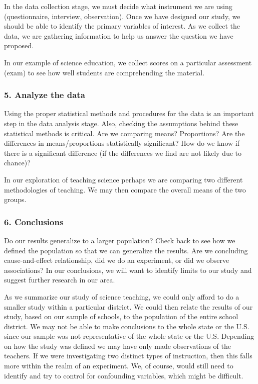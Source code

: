 \documentclass[11pt, chapterprefix=true]{scrbook}\usepackage[]{graphicx}\usepackage[]{color}
\begin{document}
In the data collection stage, we must decide what instrument we are using (questionnaire, interview, observation).  Once we have designed our study, we should be able to identify the primary variables of interest.  As we collect the data, we are gathering information to help us answer the question we have proposed.

In our example of science education, we collect scores on a particular assessment (exam) to see how well students are comprehending the material.

\subsubsection{5. Analyze the data}

Using the proper statistical methods and procedures for the data is an important step in the data analysis stage.  Also, checking the assumptions behind these statistical methods is critical.  Are we comparing means?  Proportions?  Are the differences in means/proportions statistically significant?  How do we know if there is a significant difference (if the differences we find are not likely due  to chance)?

In our exploration of teaching science perhaps we are comparing two different methodologies of teaching.  We may then compare the overall means of the two groups.

\subsubsection{6. Conclusions}

Do our results generalize to a larger population?  Check back to see how we defined the population so that we can generalize the results.  Are we concluding cause-and-effect relationship, did we do an experiment, or did we observe associations?  In our conclusions, we will want to identify limits to our study and suggest further research in our area.

As we summarize our study of science teaching, we could only afford to do a smaller study within a particular district.  We could then relate the results of our study, based on our sample of schools, to the population of the entire school district.  We may not be able to make conclusions to the whole state or the U.S. since our sample was not representative of the whole state or the U.S.  Depending on how the study was defined we may have only made observations of the teachers.  If we were investigating two distinct types of instruction, then this falls more within the realm of an experiment.  We, of course, would still need to identify and try to control for confounding variables, which might be difficult.
\end{document}
